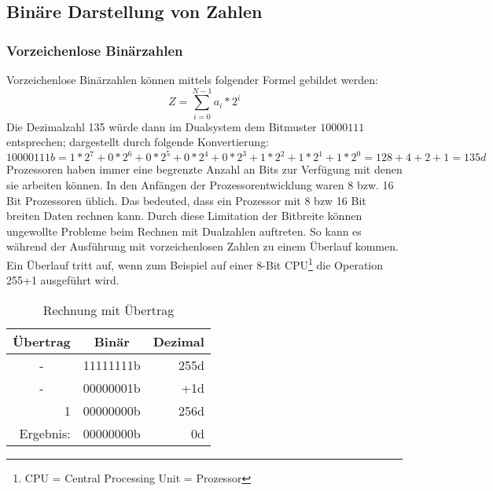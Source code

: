\documentclass[12pt]{article}
\begin{document}
\subsection{Binäre Darstellung von Zahlen}

\subsubsection{Vorzeichenlose Binärzahlen}
Vorzeichenlose Binärzahlen können mittels folgender Formel gebildet werden: $$Z=\sum\limits_{i=0}^{N-1} a_i * 2^i$$ 
Die Dezimalzahl 135 würde dann im Dualsystem dem Bitmuster $10000111$ entsprechen; dargestellt durch folgende Konvertierung:
$$10000111b = 1*2^7+0*2^6+0*2^5+0*2^4+0*2^3+1*2^2+1*2^1+1*2^0 = 128 +4+2+1 = 135d$$
Prozessoren haben immer eine begrenzte Anzahl an Bits zur Verfügung mit denen sie arbeiten können. In den Anfängen der Prozessorentwicklung waren 8 bzw. 16 Bit Prozessoren üblich. Das bedeuted, dass ein Prozessor mit 8 bzw 16 Bit breiten Daten rechnen kann. Durch diese Limitation der Bitbreite können ungewollte Probleme beim Rechnen mit Dualzahlen auftreten. So kann es während der Ausführung mit vorzeichenlosen Zahlen zu einem Überlauf kommen. Ein Überlauf tritt auf, wenn zum Beispiel auf einer 8-Bit CPU\footnote{CPU =  Central Processing Unit = Prozessor} die Operation 255+1 ausgeführt wird.

\begin{table}[!htb]
\centering
\begin{tabular}{|c|r|r|}
\hline
\textbf{Übertrag}               & \multicolumn{1}{c|}{\textbf{Binär}} & \multicolumn{1}{c|}{\textbf{Dezimal}} \\ \hline
-                               & 11111111b                            & 255d                                   \\ \hline
-                               & 00000001b                            & +1d                                     \\ \hline
\multicolumn{1}{|r|}{1}         & 00000000b                            & 256d                                   \\ \hline\hline
\multicolumn{1}{|r|}{Ergebnis:} & 00000000b                            & 0d                                     \\ \hline
\end{tabular}
\caption{Rechnung mit Übertrag}
\label{tab:uebertrag}
\end{table}
\end{document}
